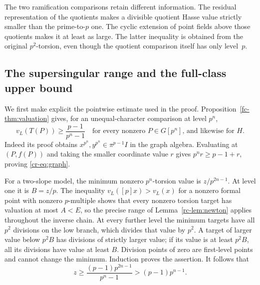 \begin{remark}
The two ramification comparisons retain different information. The
residual representation of the quotients makes a divisible quotient
Hasse value strictly smaller than the prime-to-$p$ one. The cyclic
extension of point fields above those quotients makes it at least as
large. The latter inequality is obtained from the original
$p^2$-torsion, even though the quotient comparison itself has only
level~$p$.
\end{remark}

\subsection{The supersingular range and the full-class upper bound}
We first make explicit the pointwise estimate used in the proof. Proposition~\ref{fc-thm:valuation} gives, for an unequal-character comparison at level $p^n$,
\begin{equation}\label{cr-eq:graph}
 v_L(T(P))\ge\frac{p-1}{p^n-1}
 \quad\text{for every nonzero $P\in G[p^n]$, and likewise for $H$.}
\end{equation}
Indeed its proof obtains $x^{p^n},y^{p^n}\in\pi^{p-1}I$ in the graph algebra. Evaluating at $(P,f(P))$ and taking the smaller coordinate value $r$ gives $p^nr\ge p-1+r$, proving \eqref{cr-eq:graph}.

For a two-slope model, the minimum nonzero $p^n$-torsion value is $z/p^{2n-1}$. At level one it is $B=z/p$. The inequality $v_L([p]x)>v_L(x)$ for a nonzero formal point with nonzero $p$-multiple shows that every nonzero torsion target has valuation at most $A<E$, so the precise range of Lemma~\ref{rc-lem:newton} applies throughout the inverse chain. At every further level the minimum targets have all $p^2$ divisions on the low branch, which divides that value by $p^2$. A target of larger value below $p^2B$ has divisions of strictly larger value; if its value is at least $p^2B$, all its divisions have value at least $B$. Division points of zero are first-level points and cannot change the minimum. Induction proves the assertion. It follows that
\begin{equation}\label{cr-eq:zbound}
 z\ge\frac{(p-1)p^{2n-1}}{p^n-1}>(p-1)p^{n-1}.
\end{equation}

